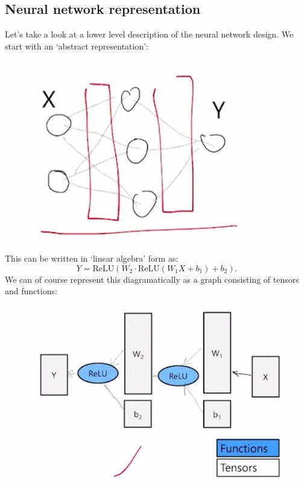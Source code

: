 \subsection{Neural network representation}
Let's take a look at a lower level description of the neural network design. We start with an `abstract representation': 
\begin{figure}[H]
\centering
\includegraphics[scale=0.4]{abstractnn.png}
\end{figure}
This can be written in `linear algebra' form as:
\begin{equation*}
Y = \textrm{ReLU}\left(W_2 \cdot \textrm{ReLU}(W_1 X + b_1) + b_2 \right).
\end{equation*}
We can of course represent this diagramatically as a graph consisting of tensors and functions:
\begin{figure}[H]
\centering
\includegraphics[scale=0.4]{diagramnn.png}
\end{figure}


